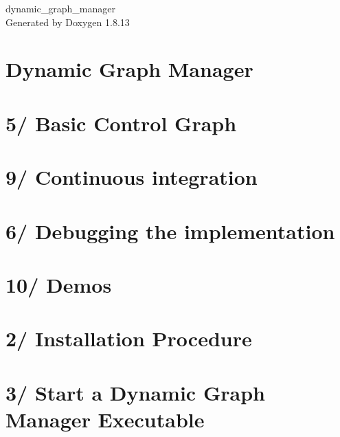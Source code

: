 \documentclass[twoside]{book}
\newcommand{\+}{\discretionary{\mbox{\scriptsize$\hookleftarrow$}}{}{}}
\newcommand{\clearemptydoublepage}{%
  \newpage{\pagestyle{empty}\cleardoublepage}%
}
\begin{document}
\hypersetup{pageanchor=false,
             bookmarksnumbered=true,
             pdfencoding=unicode
            }
\begin{titlepage}
\vspace*{7cm}
\begin{center}%
{\Large dynamic\+\_\+graph\+\_\+manager }\\
\vspace*{1cm}
{\large Generated by Doxygen 1.8.13}\\
\end{center}
\end{titlepage}
\clearemptydoublepage
{}
\tableofcontents
\clearemptydoublepage
{}
\hypersetup{pageanchor=true}

\chapter{Dynamic Graph Manager}
\label{index}\hypertarget{index}{}
\chapter{5/ Basic Control Graph}
\label{subpage_basic_control_graph}

\chapter{9/ Continuous integration}
\label{subpage_ci}

\chapter{6/ Debugging the implementation}
\label{subpage_debugging}

\chapter{10/ Demos}
\label{subpage_demos}

\chapter{2/ Installation Procedure}
\label{subpage_installation}

\chapter{3/ Start a Dynamic Graph Manager Executable}
\label{subpage_launch}

\end{document}
